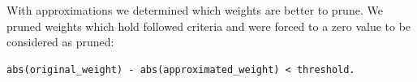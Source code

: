 \documentclass{article} %
\begin{document}
With approximations we determined which weights are better to prune. We pruned
weights which hold followed criteria and were forced to a zero value to be
considered as pruned:

\begin{lstlisting}
abs(original_weight) - abs(approximated_weight) < threshold.
\end{lstlisting}


\end{document}
